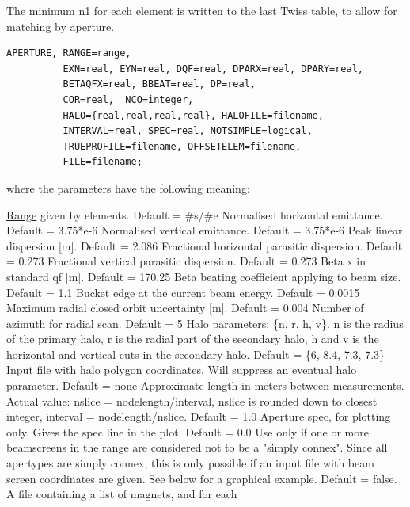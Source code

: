 The minimum n1 for each element is written to the last Twiss table, to
allow for \href{../match/match.html}{matching} by aperture.   
	
\begin{verbatim}
APERTURE, RANGE=range,
          EXN=real, EYN=real, DQF=real, DPARX=real, DPARY=real, 
          BETAQFX=real, BBEAT=real, DP=real, 
          COR=real,  NCO=integer, 
          HALO={real,real,real,real}, HALOFILE=filename,
          INTERVAL=real, SPEC=real, NOTSIMPLE=logical, 
          TRUEPROFILE=filename, OFFSETELEM=filename, 
          FILE=filename;  
\end{verbatim} 
where the parameters have the following meaning: 
\begin{madlist}
    \href{../Introduction/ranges.html}{Range} given by
     elements. Default = \#s/\#e  
    Normalised horizontal emittance. Default = 3.75*e-6  
    Normalised vertical emittance. Default = 3.75*e-6 
    Peak linear dispersion [m]. Default = 2.086 
    Fractional horizontal parasitic dispersion. Default = 0.273 
    Fractional vertical parasitic dispersion. Default = 0.273 
    Beta x in standard qf [m]. Default = 170.25 
    Beta beating coefficient applying to beam size. Default = 1.1 
    Bucket edge at the current beam energy. Default = 0.0015 
    Maximum radial closed orbit uncertainty [m]. Default = 0.004 
    Number of azimuth for radial scan. Default = 5 
    Halo parameters: \{n, r, h, v\}. n is the radius of the
     primary halo,  r is the radial part of the secondary halo, h and v
     is the horizontal and  vertical cuts in the secondary halo. Default
     = \{6, 8.4, 7.3, 7.3\}  
    Input file with halo polygon coordinates. Will
     suppress  an eventual halo parameter. Default = none  
    Approximate length in meters between
     measurements. Actual value:  nslice = nodelength/interval, nslice
     is rounded down to closest integer,  interval =
     nodelength/nslice. Default = 1.0  
    Aperture spec, for plotting only. Gives the spec line in
     the plot. Default = 0.0  
    Use only if one or more beamscreens in the range are
     considered not to  be a "simply connex". Since all \madx apertypes
     are simply connex, this is only possible  if an input file with
     beam screen coordinates are given. See below for a graphical
     example. Default = false.  
    A file containing a list of magnets, and for each

\end{madlist}
